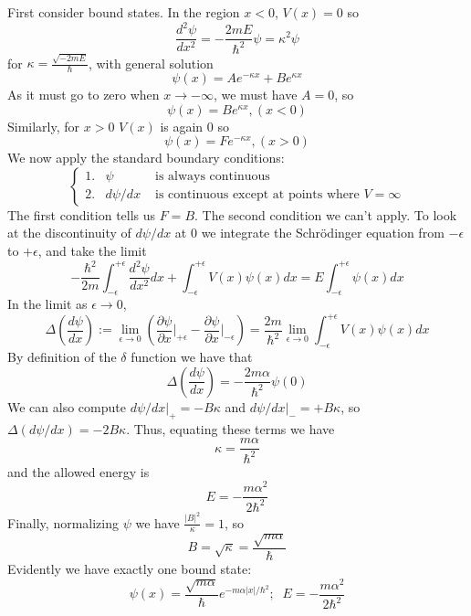 \documentclass[12pt, a4paper, oneside, openright, titlepage]{book}
\begin{document}
First consider bound states. In the region $x < 0$, $V(x) = 0$ so \begin{equation*}
    \frac{d^2\psi}{dx^2} = -\frac{2mE}{\hbar^2}\psi = \kappa^2\psi
\end{equation*}
for $\kappa = \frac{\sqrt{-2mE}}{\hbar}$, with general solution \begin{equation*}
    \psi(x) = Ae^{-\kappa x}+Be^{\kappa x}
\end{equation*}
As it must go to zero when $x\rightarrow -\infty$, we must have $A = 0$, so $$\psi(x) = Be^{\kappa x}, (x < 0)$$
Similarly, for $x > 0$ $V(x)$ is again $0$ so $$\psi(x) = Fe^{-\kappa x}, (x > 0)$$
We now apply the standard boundary conditions: \begin{equation*}
    \boxed{\left\{\begin{array}{ccc} 1. & \psi & \text{ is always continuous} \\ 2. & d\psi/dx & \text{ is continuous except at points where $V = \infty$} \end{array}\right.}
\end{equation*}
The first condition tells us $F = B$. The second condition we can't apply. To look at the discontinuity of $d\psi/dx$ at $0$ we integrate the Schr\"{o}dinger equation from $-\epsilon$ to $+\epsilon$, and take the limit \begin{equation*}
    -\frac{\hbar^2}{2m}\int_{-\epsilon}^{+\epsilon}\frac{d^2\psi}{dx^2}dx + \int_{-\epsilon}^{+\epsilon}V(x)\psi(x)dx = E\int_{-\epsilon}^{+\epsilon}\psi(x)dx
\end{equation*}
In the limit as $\epsilon \rightarrow 0$, \begin{equation*}
    \Delta\left(\frac{d\psi}{dx}\right) :=\lim\limits_{\epsilon\rightarrow 0}\left(\frac{\partial\psi}{\partial x}\Bigg\rvert_{+\epsilon} - \frac{\partial \psi}{\partial x}\Bigg\rvert_{-\epsilon}\right) = \frac{2m}{\hbar^2}\lim\limits_{\epsilon\rightarrow 0}\int_{-\epsilon}^{+\epsilon}V(x)\psi(x)dx
\end{equation*}
By definition of the $\delta$ function we have that \begin{equation*}
    \boxed{\Delta \left(\frac{d\psi}{dx}\right) = -\frac{2m\alpha}{\hbar^2}\psi(0)}
\end{equation*}
We can also compute $d\psi/dx\vert_+ = -B\kappa$ and $d\psi/dx\vert_- = +B\kappa$, so $\Delta(d\psi/dx) = -2B\kappa$. Thus, equating these terms we have \begin{equation*}
    \kappa = \frac{m\alpha}{\hbar^2}
\end{equation*}
and the allowed energy is $$E = -\frac{m\alpha^2}{2\hbar^2}$$
Finally, normalizing $\psi$ we have $\frac{|B|^2}{\kappa} = 1$, so \begin{equation*}
    B = \sqrt{\kappa} = \frac{\sqrt{m\alpha}}{\hbar}
\end{equation*}
Evidently we have exactly one bound state:\begin{equation*}
    \boxed{\psi(x) = \frac{\sqrt{m\alpha}}{\hbar}e^{-m\alpha|x|/\hbar^2};\;\;E=-\frac{m\alpha^2}{2\hbar^2}}
\end{equation*}
\end{document}
